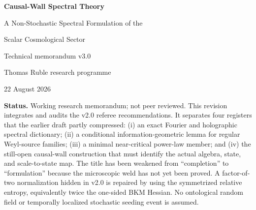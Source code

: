 \documentclass[11pt]{article}
\numberwithin{equation}{section}
\theoremstyle{definition}
\theoremstyle{remark}
\begin{document}
\hypersetup{pageanchor=false}
\begin{titlepage}
\thispagestyle{empty}
\centering
\vspace*{0.42in}
{\Huge\bfseries\color{ink} Causal-Wall Spectral Theory\par}
\vspace{0.18in}
{\LARGE A Non-Stochastic Spectral Formulation of the\par}
\vspace{0.06in}
{\LARGE Scalar Cosmological Sector\par}
\vspace{0.42in}
{\Large Technical memorandum v3.0\par}
\vspace{0.52in}
{\large Thomas Ruble research programme\par}
\vspace{0.10in}
{\normalsize 22 August 2026\par}
\vfill
\begin{minipage}{0.93\textwidth}
\small
\textbf{Status.} Working research memorandum; not peer reviewed. This revision integrates and audits the v2.0 referee recommendations. It separates four registers that the earlier draft partly compressed: (i) an exact Fourier and holographic spectral dictionary; (ii) a conditional information-geometric lemma for regular Weyl-source families; (iii) a minimal near-critical power-law member; and (iv) the still-open causal-wall construction that must identify the actual algebra, state, and scale-to-state map. The title has been weakened from ``completion'' to ``formulation'' because the microscopic weld has not yet been proved. A factor-of-two normalization hidden in v2.0 is repaired by using the symmetrized relative entropy, equivalently twice the one-sided BKM Hessian. No ontological random field or temporally localized stochastic seeding event is assumed.
\end{minipage}
\end{titlepage}
\hypersetup{pageanchor=true}
\setcounter{page}{1}
\end{document}
